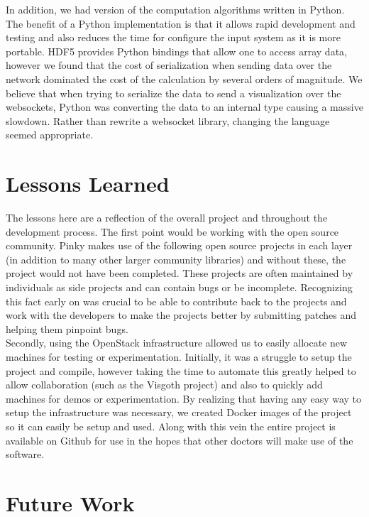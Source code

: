 In addition, we had version of the computation algorithms written in Python.
The benefit of a Python implementation is that it allows rapid development and
testing and also reduces the time for configure the input system as it is more
portable. HDF5 provides Python bindings that allow one to access array data,
however we found that the cost of serialization when sending data over the
network dominated the cost of the calculation by several orders of magnitude.
We believe that when trying to serialize the data to send a visualization over
the websockets, Python was converting the data to an internal type causing a
massive slowdown. Rather than rewrite a websocket library, changing the
language seemed appropriate.

\section{Lessons Learned}

The lessons here are a reflection of the overall project and throughout the
development process. The first point would be working with the open source
community. Pinky makes use of the following open source projects \cite{edflib}
\cite{dropbox-json} \cite{websocket-server} \cite{tiledb} \cite{happyhttp} in
each layer (in addition to many other larger community libraries) and without
these, the project would not have been completed. These projects are often
maintained by individuals as side projects and can contain bugs or be
incomplete. Recognizing this fact early on was crucial to be able to contribute
back to the projects and work with the developers to make the projects better
by submitting patches and helping them pinpoint bugs. \\


Secondly, using the OpenStack infrastructure allowed us to easily allocate new
machines for testing or experimentation. Initially, it was a struggle to setup
the project and compile, however taking the time to automate this greatly
helped to allow collaboration (such as the Visgoth project) and also to quickly
add machines for demos or experimentation. By realizing that having any easy
way to setup the infrastructure was necessary, we created Docker \cite{docker}
images of the project so it can easily be setup and used.  Along with this vein
the entire project is available on Github \cite{eeg-toolkit} for use in the
hopes that other doctors will make use of the software.

\section{Future Work}\label{discuss-ch:future-work}

